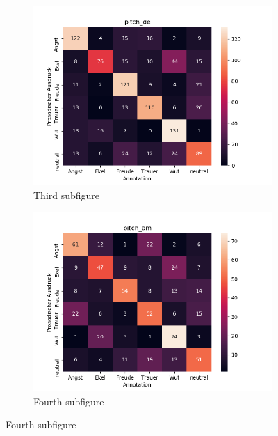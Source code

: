 \documentclass[11pt,a4paper,headsepline,twoside,toc=bibliography]{scrreprt}
\begin{document}
\begin{figure}[t!]
	\medskip
	\begin{subfigure}{0.48\textwidth}
		\includegraphics[width=\linewidth]{plots/heatmap/conf_pitch_de.png}
		\caption{Third subfigure} \label{fig:conf_pitch_de}
	\end{subfigure}\hspace*{\fill}
	\begin{subfigure}{0.48\textwidth}
		\includegraphics[width=\linewidth]{plots/heatmap/conf_pitch_am.png}
		\caption{Fourth subfigure} \label{fig:conf_pitch_am}
	\end{subfigure}
	

\end{figure}
\end{document}
